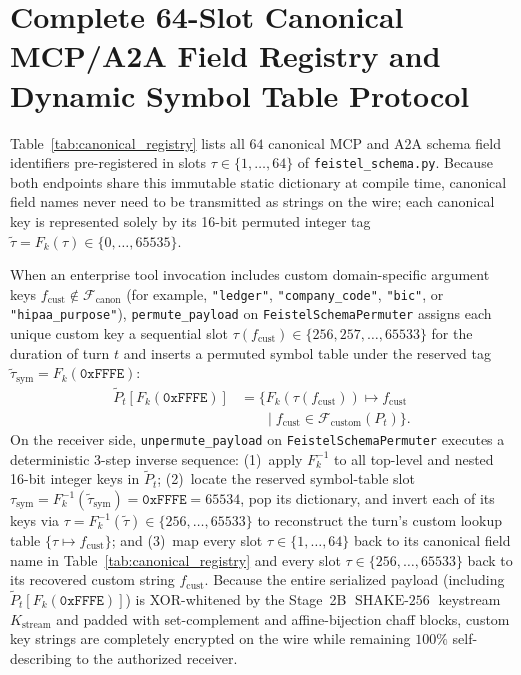 \documentclass[conference,10pt]{IEEEtran}
\begin{document}
\section{Complete 64-Slot Canonical MCP/A2A Field Registry and Dynamic Symbol Table Protocol}
\label{app:registry}

Table~\ref{tab:canonical_registry} lists all $64$ canonical MCP and A2A schema field identifiers pre-registered in slots $\tau \in \{1, \dots, 64\}$ of \texttt{feistel\_schema.py}. Because both endpoints share this immutable static dictionary at compile time, canonical field names never need to be transmitted as strings on the wire; each canonical key is represented solely by its 16-bit permuted integer tag $\tilde{\tau} = F_k(\tau) \in \{0, \dots, 65535\}$.

When an enterprise tool invocation includes custom domain-specific argument keys $f_{\text{cust}} \notin \mathcal{F}_{\text{canon}}$ (for example, \texttt{"ledger"}, \texttt{"company\_code"}, \texttt{"bic"}, or \texttt{"hipaa\_purpose"}), \texttt{permute\_payload} on \texttt{FeistelSchemaPermuter} assigns each unique custom key a sequential slot $\tau(f_{\text{cust}}) \in \{256, 257, \dots, 65533\}$ for the duration of turn $t$ and inserts a permuted symbol table under the reserved tag $\tilde{\tau}_{\text{sym}} = F_k(\mathtt{0xFFFE})$:
\begin{equation}
\label{eq:sym_table}
\begin{aligned}
\tilde{P}_t\left[F_k(\mathtt{0xFFFE})\right] &= \Big\{ F_k(\tau(f_{\text{cust}})) \mapsto f_{\text{cust}} \\
&\qquad \Big|\; f_{\text{cust}} \in \mathcal{F}_{\text{custom}}(P_t) \Big\}.
\end{aligned}
\end{equation}
On the receiver side, \texttt{unpermute\_payload} on \texttt{FeistelSchemaPermuter} executes a deterministic 3-step inverse sequence: (1)~apply $F_k^{-1}$ to all top-level and nested 16-bit integer keys in $\tilde{P}_t$; (2)~locate the reserved symbol-table slot $\tau_{\text{sym}} = F_k^{-1}(\tilde{\tau}_{\text{sym}}) = \mathtt{0xFFFE} = 65534$, pop its dictionary, and invert each of its keys via $\tau = F_k^{-1}(\tilde{\tau}) \in \{256,\dots,65533\}$ to reconstruct the turn's custom lookup table $\{\tau \mapsto f_{\text{cust}}\}$; and (3)~map every slot $\tau \in \{1,\dots,64\}$ back to its canonical field name in Table~\ref{tab:canonical_registry} and every slot $\tau \in \{256,\dots,65533\}$ back to its recovered custom string $f_{\text{cust}}$. Because the entire serialized payload (including $\tilde{P}_t[F_k(\mathtt{0xFFFE})]$) is XOR-whitened by the Stage~2B $\operatorname{SHAKE-256}$ keystream $K_{\text{stream}}$ and padded with set-complement and affine-bijection chaff blocks, custom key strings are completely encrypted on the wire while remaining $100\%$ self-describing to the authorized receiver.
\end{document}
